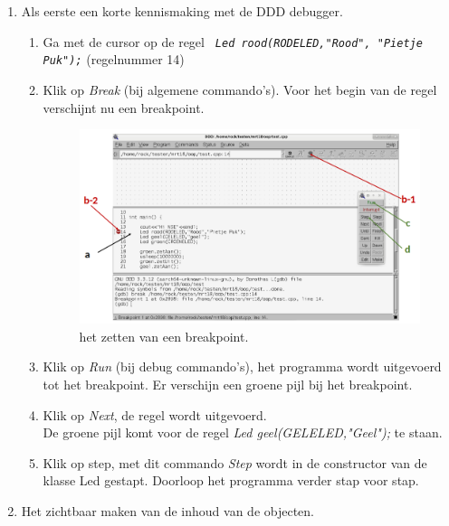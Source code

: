 \begin{enumerate} [label=\alph*]
	\item Als eerste een korte kennismaking met de DDD debugger.
\begin{enumerate} [label=\roman*]

	\item Ga met de cursor op de regel \texttt{\textit{ Led rood(RODELED,"Rood", "Pietje Puk");}}
	(regelnummer 14)
	\item Klik op \textit{Break} (bij algemene commando's). Voor het begin van de regel verschijnt nu een breakpoint.

\begin{figure}[h!]
	\captionsetup{justification=centering}
	\includegraphics[width=0.7 \linewidth]{figuren/ddd_set_breakpoint}
	\centering
	\caption{het zetten van een breakpoint.}
	\label{fig:ddduitv1}
\end{figure}
	\item Klik op \textit{Run} (bij debug commando's),
het programma wordt uitgevoerd tot het breakpoint. Er verschijn een groene pijl bij het breakpoint.
\item Klik op \textit{Next}, de regel wordt uitgevoerd. \\
De groene pijl komt voor de regel \textit{Led geel(GELELED,"Geel");} te staan. 
\item Klik op step, met dit commando \textit{Step} wordt in de constructor van de klasse Led gestapt. Doorloop het programma verder stap voor stap.

\end{enumerate}
\item Het zichtbaar maken van de inhoud van de objecten.



\end{enumerate}
